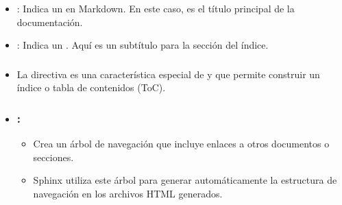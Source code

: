 \documentclass[a4paper,10pt,spanish]{sphinxmanual}
\begin{document}
\begin{itemize}
\begin{itemize}
\begin{sphinxVerbatim}[commandchars=\\\{\}]

 
 

\end{sphinxVerbatim}

\item {} 
\sphinxAtStartPar
\sphinxcode{\sphinxupquote{\#}}: Indica un  en Markdown. En este caso, es el título principal de la documentación.

\item {} 
\sphinxAtStartPar
\sphinxcode{\sphinxupquote{\#\#}}: Indica un . Aquí es un subtítulo para la sección del índice.

\item {} \subsubsection*{}

\sphinxAtStartPar
La directiva  es una característica especial de  y  que permite construir un índice o tabla de contenidos (ToC).

\item {} \subsubsection*{:}
\begin{itemize}
\item {} 
\sphinxAtStartPar
Crea un árbol de navegación que incluye enlaces a otros documentos o secciones.

\item {} 
\sphinxAtStartPar
Sphinx utiliza este árbol para generar automáticamente la estructura de navegación en los archivos HTML generados.


\end{itemize}
\end{itemize}
\end{itemize}
\end{document}
